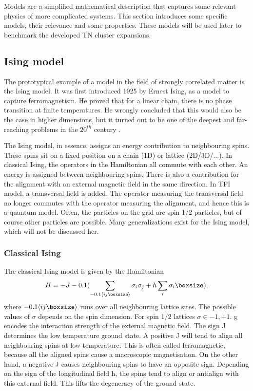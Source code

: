 Models are a simplified mathematical description that captures some relevant physics of more complicated systems. This section introduces some specific models, their relevance and some properties. These models will be used later to benchmark the developed \Gls{TN} cluster expansions.

\subsection{Ising model}\label{models:ising}

The prototypical example of a model in the field of strongly correlated matter is the Ising model. It was first introduced 1925 by Ernest Ising, as a model to capture ferromagnetism. He proved that for a linear chain, there is no phase transition at finite temperatures. He wrongly concluded that this would also be the case in higher dimensions, but it turned out to be one of the deepest and far-reaching problems in the $20^{th}$ century \cite{Taroni2015}.

The Ising model, in essence, assigns an energy contribution to neighbouring spins. These spins sit on a fixed position on a chain (1D) or lattice (2D/3D/...). In classical Ising, the operators in the Hamiltonian all commute with each other. An energy is assigned between neighbouring spins. There is also a contribution for the alignment with an external magnetic field in the same direction. In \Gls{TFI} model, a transversal field is added. The operator measuring the transversal field no longer commutes with the operator measuring the alignment, and hence this is a quantum model. Often, the particles on the grid are spin 1/2 particles, but of course other particles are possible. Many generalizations exist for the Ising model, which will not be discussed her.

\subsubsection{Classical Ising}

The classical Ising model is given by the Hamiltonian
\begin{equation}
    H = -J \left (  \sum_{\Braket{i j }} \sigma_i \sigma_j + h \sum_i \sigma_i \right ),
\end{equation}
where $  \Braket{i j }$ runs over all neighbouring lattice sites. The possible values of $\sigma$ depends on the spin dimension. For spin $1/2$ lattices $\sigma \in {-1,+1}$. g encodes the interaction strength of the external magnetic field. The sign J determines the low temperature ground state. A positive J will tend to align all neighbouring spins at low temperature. This is often called ferromagnetic, because all the aligned spins cause a macroscopic magnetisation. On the other hand, a negative J causes neighbouring spins to have an opposite sign. Depending on the sign of the longitudinal field h, the spins tend to align or antialign with this external field. This lifts the degeneracy of the ground state.

